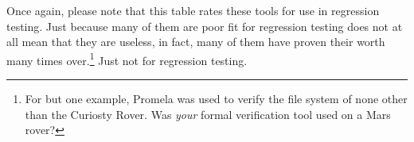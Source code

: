 Once again, please note that this table rates these tools for use in
regression testing.
Just because many of them are poor fit for regression testing does
not at all mean that they are useless, in fact,
many of them have proven their worth many times over.\footnote{
	For but one example, Promela was used to verify the file system
	of none other than the Curiosty Rover.
	Was \emph{your} formal verification tool used on a Mars rover?}
Just not for regression testing.
